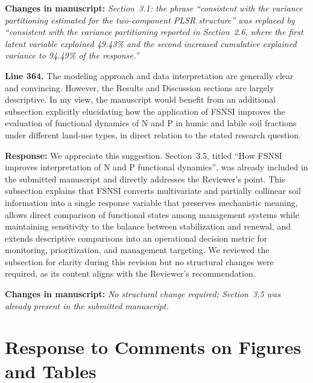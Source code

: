 \documentclass[11pt,a4paper]{article}
\newcommand{\response}[1]{\par\noindent\textcolor{responsecolor}{\textbf{Response:}} #1}
\newcommand{\change}[1]{\par\noindent\textcolor{changecolor}{\textbf{Changes in manuscript:}} \textit{#1}}
\begin{document}
\change{Section~3.1: the phrase ``consistent with the variance partitioning estimated for the two-component PLSR structure'' was replaced by ``consistent with the variance partitioning reported in Section~2.6, where the first latent variable explained 49.43\% and the second increased cumulative explained variance to 94.49\% of the response.''}

\bigskip


\begin{reviewerbox}
\textbf{Line 364.} The modeling approach and data interpretation are generally clear and convincing. However, the Results and Discussion sections are largely descriptive. In my view, the manuscript would benefit from an additional subsection explicitly elucidating how the application of FSNSI improves the evaluation of functional dynamics of N and P in humic and labile soil fractions under different land-use types, in direct relation to the stated research question.
\end{reviewerbox}

\response{We appreciate this suggestion. Section~3.5, titled ``How FSNSI improves interpretation of N and P functional dynamics'', was already included in the submitted manuscript and directly addresses the Reviewer's point. This subsection explains that FSNSI converts multivariate and partially collinear soil information into a single response variable that preserves mechanistic meaning, allows direct comparison of functional states among management systems while maintaining sensitivity to the balance between stabilization and renewal, and extends descriptive comparisons into an operational decision metric for monitoring, prioritization, and management targeting. We reviewed the subsection for clarity during this revision but no structural changes were required, as its content aligns with the Reviewer's recommendation.}

\change{No structural change required; Section~3.5 was already present in the submitted manuscript.}

\bigskip

\section*{Response to Comments on Figures and Tables}
\end{document}
